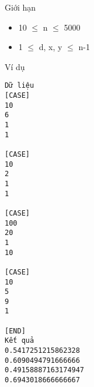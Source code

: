 Giới hạn
\begin{itemize}
	\item     10  $\le$  n  $\le$  5000   
	\item     1  $\le$  d, x, y  $\le$  n-1   
\end{itemize}
Ví dụ
\begin{verbatim}
Dữ liệu
[CASE]
10
6
1
1

[CASE]
10
2
1
1

[CASE]
100
20
1
10

[CASE]
10
5
9
1

[END]
Kết quả
0.5417251215862328
0.6090494791666666
0.49158887163174947
0.6943018666666667
\end{verbatim}